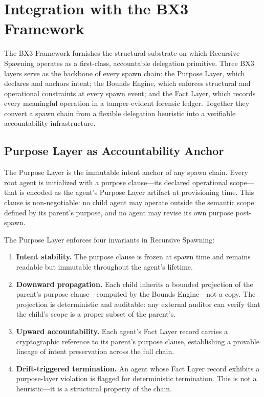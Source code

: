 \section{Integration with the BX3 Framework}
\label{sec:bx3_integration}

The BX3 Framework furnishes the structural substrate on which Recursive Spawning operates as a first-class, accountable delegation primitive. Three BX3 layers serve as the backbone of every spawn chain: the Purpose Layer, which declares and anchors intent; the Bounds Engine, which enforces structural and operational constraints at every spawn event; and the Fact Layer, which records every meaningful operation in a tamper-evident forensic ledger. Together they convert a spawn chain from a flexible delegation heuristic into a verifiable accountability infrastructure.

\subsection{Purpose Layer as Accountability Anchor}
\label{sec:purpose_anchor}

The Purpose Layer is the immutable intent anchor of any spawn chain. Every root agent is initialized with a purpose clause—its declared operational scope—that is encoded as the agent's Purpose Layer artifact at provisioning time. This clause is non-negotiable: no child agent may operate outside the semantic scope defined by its parent's purpose, and no agent may revise its own purpose post-spawn.

The Purpose Layer enforces four invariants in Recursive Spawning:

\begin{enumerate}
    \item \textbf{Intent stability.} The purpose clause is frozen at spawn time and remains readable but immutable throughout the agent's lifetime.
    \item \textbf{Downward propagation.} Each child inherits a bounded projection of the parent's purpose clause—computed by the Bounds Engine—not a copy. The projection is deterministic and auditable: any external auditor can verify that the child's scope is a proper subset of the parent's.
    \item \textbf{Upward accountability.} Each agent's Fact Layer record carries a cryptographic reference to its parent's purpose clause, establishing a provable lineage of intent preservation across the full chain.
    \item \textbf{Drift-triggered termination.} An agent whose Fact Layer record exhibits a purpose-layer violation is flagged for deterministic termination. This is not a heuristic—it is a structural property of the chain.
\end{enumerate}

